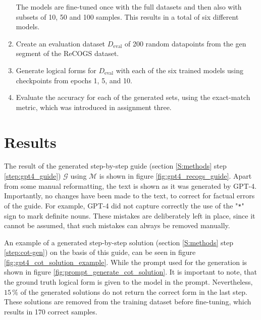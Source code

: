 \documentclass[11pt]{article}
\begin{document}
\begin{enumerate}
        The models are fine-tuned once with the full datasets and then also with subsets of 10, 50 and 100 samples.
        This results in a total of six different models.

        \item Create an evaluation dataset $D_\mathrm{eval}$ of 200 random datapoints from the gen segment of the ReCOGS dataset.

        \item Generate logical forms for $D_\mathrm{eval}$ with each of the six trained models using checkpoints from epochs 1, 5, and 10.

        \item Evaluate the accuracy for each of the generated sets, using the exact-match metric, which was introduced in
        assignment three.
%
    \end{enumerate}



    \section{Results}
    The result of the generated step-by-step guide (section \ref{S:methods} step \ref{step:gpt4_guide})
    $\mathcal{G}$ using $\mathcal{M}$ is shown in figure \ref{fig:gpt4_recogs_guide}.
    Apart from some manual reformatting, the text is shown as it was generated by GPT-4.
    Importantly, no changes have been made to the text, to correct for factual errors of the guide.
    For example, GPT-4 did not capture correctly the use of the "\texttt{*}" sign to mark definite nouns.
    These mistakes are deliberately left in place, since it cannot be assumed,
    that such mistakes can always be removed manually.

    An example of a generated step-by-step solution (section \ref{S:methods} step \ref{step:cot-gen}) on the basis of this guide,
    can be seen in figure \ref{fig:gpt4_cot_solution_example}.
    While the prompt used for the generation is shown in figure \ref{fig:prompt_generate_cot_solution}.
    It is important to note, that the ground truth logical form is given to the model in the prompt.
    Nevertheless, $15\,\%$ of the generated solutions do not return the correct form in the last step.
    These solutions are removed from the training dataset before fine-tuning, which results in 170 correct samples.
\end{document}
